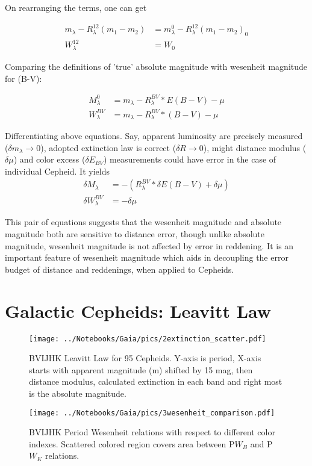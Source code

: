 \documentclass[12pt,a4paper]{article}
\begin{document}
On rearranging the terms, one can get

\begin{align}
m_\lambda - R_\lambda^{12}(m_1 - m_2) & = m_\lambda^0 - R_\lambda^{12}(m_1 - m_2)_0 \\
W_\lambda^{12} & = W_0
\end{align}

Comparing the definitions of 'true' absolute magnitude with wesenheit magnitude for (B-V): 

\begin{align*}
    M_\lambda^0 & = m_\lambda - R_\lambda^{BV}*E(B-V) - \mu\\
    W_\lambda^{BV} & = m_\lambda - R_\lambda^{BV} * (B-V) - \mu
\end{align*}

Differentiating above equations. Say, apparent luminosity are precisely measured ($\delta m_\lambda \to 0$), adopted extinction law is correct ($\delta R \to 0$), 
might distance modulus ($\delta \mu $) and color excess ($\delta E_{BV} $) measurements could
have error in the case of individual Cepheid. It yields
\begin{align*}
    \delta M_\lambda & = - ( R_\lambda^{BV}* \delta E(B-V) + \delta \mu)\\
    \delta W_\lambda^{BV} & = - \delta \mu
\end{align*}

This pair of equations suggests that the wesenheit magnitude and absolute magnitude both are sensitive to distance error, 
though unlike absolute magnitude, wesenheit magnitude is not affected by error in reddening.  It is an important feature of wesenheit magnitude which aids in decoupling the error budget of distance and reddenings, when applied to Cepheids.

\section{Galactic Cepheids: Leavitt Law }
\begin{figure}
	\centering
	\texttt{[image: ../Notebooks/Gaia/pics/2extinction\_scatter.pdf]}  
	\label{fig:PLrelation}
	\caption{\small BVIJHK Leavitt Law for 95 Cepheids. Y-axis is period, X-axis starts with apparent
		magnitude (m) shifted by 15 mag, then distance modulus, calculated extinction in each band
		and right most is the absolute magnitude.}
\end{figure} 
\begin{figure}
	\centering
	\texttt{[image: ../Notebooks/Gaia/pics/3wesenheit\_comparison.pdf]}  
	\label{fig:PWrelation}
	\caption{\small BVIJHK Period Wesenheit relations with respect to different color indexes. Scattered colored region covers area between P$W_B$ and P$W_K$ relations. }
\end{figure} 
\end{document}
